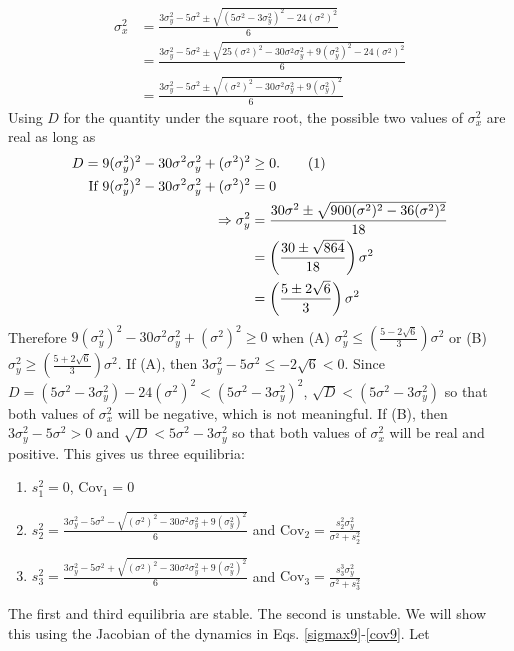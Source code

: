 \documentclass{article}
\newcommand{\Cov}{\text{Cov}}
\newcommand\numberthis{\addtocounter{equation}{1}\tag{\theequation}}
\begin{document}
\begin{enumerate}
\begin{align*}
\sigma_x^2&=\frac{3\sigma_y^2-5\sigma^2\pm\sqrt{(5\sigma^2-3\sigma_y^2)^2-24(\sigma^2)^2}}{6}
\\&=\frac{3\sigma_y^2-5\sigma^2\pm\sqrt{25(\sigma^2)^2-30\sigma^2\sigma_y^2+9(\sigma_y^2)^2-24(\sigma^2)^2}}{6}
\\&=\frac{3\sigma_y^2-5\sigma^2\pm\sqrt{(\sigma^2)^2-30\sigma^2\sigma_y^2+9(\sigma_y^2)^2}}{6}
\end{align*}
Using $D$ for the quantity under the square root, the possible two values of $\sigma_x^2$ are real as long as 
\begin{align*}
D=9(\sigma_y^2)^2-30\sigma^2\sigma_y^2+(\sigma^2)^2&\geq 0. \numberthis \label{y_ineq}
\\\text{ If } 9(\sigma_y^2)^2-30\sigma^2\sigma_y^2+(\sigma^2)^2&=0
\\ \Rightarrow \sigma_y^2&=\frac{30\sigma^2\pm\sqrt{900(\sigma^2)^2-36(\sigma^2)^2}}{18}
\\ &=\left(\frac{30\pm\sqrt{864}}{18}\right)\sigma^2
\\&=\left(\frac{5\pm 2 \sqrt{6}}{3}\right)\sigma^2
\end{align*}
Therefore $9(\sigma_y^2)^2-30\sigma^2\sigma_y^2+(\sigma^2)^2\geq 0$ when (A) $\sigma_y^2\leq \left(\frac{5-2\sqrt{6}}{3}\right)\sigma^2$ or (B) $\sigma_y^2\geq \left(\frac{5+2\sqrt{6}}{3}\right)\sigma^2$. If (A), then $3\sigma_y^2-5\sigma^2\leq -2\sqrt{6}<0$. Since $D=(5\sigma^2-3\sigma_y^2)-24(\sigma^2)^2<(5\sigma^2-3\sigma_y^2)^2$, $\sqrt{D}<(5\sigma^2-3\sigma_y^2)$ so that both values of $\sigma_x^2$ will be negative, which is not meaningful. If (B), then $3\sigma_y^2-5\sigma^2>0$ and $\sqrt{D}<5\sigma^2-3\sigma_y^2$ so that both values of $\sigma_x^2$ will be real and positive.  This gives us three equilibria:
\begin{enumerate}[1.]
\item $s_1^2=0$, $\Cov_1=0$
\item $s_2^{2}=\frac{3\sigma_y^2-5\sigma^2-\sqrt{(\sigma^2)^2-30\sigma^2\sigma_y^2+9(\sigma_y^2)^2}}{6}$ and $\Cov_2=\frac{s_2^{2}\sigma_y^2}{\sigma^2+s_2^2}$
\item $s_3^{2}=\frac{3\sigma_y^2-5\sigma^2+\sqrt{(\sigma^2)^2-30\sigma^2\sigma_y^2+9(\sigma_y^2)^2}}{6}$ and $\Cov_3=\frac{s_3^3\sigma_y^2}{\sigma^2+s_3^2}$
\end{enumerate}
The first and third equilibria are stable. The second is unstable. We will show this using the Jacobian of the dynamics in Eqs. \ref{sigmax9}-\ref{cov9}. Let 
\begin{align*}

\end{align*}
\end{enumerate}
\end{document}
